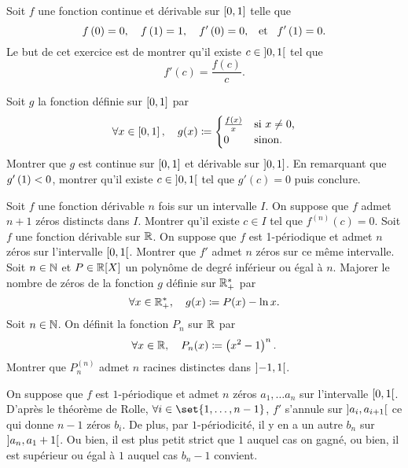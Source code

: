 \documentclass{magnolia}
\begin{document}
Soit $f$ une fonction continue et dérivable sur $\left[0,1\right]$ telle que
\[f\left(0\right)=0, \quad f\left(1\right)=1, \quad f'\left(0\right)=0, \quad\!\text{et}\quad\! f'\left(1\right)=0.\]
Le but de cet exercice est de montrer qu'il existe $c\in\left]0,1\right[$ tel
que
\[f'(c)=\frac{f(c)}{c}.\]
\begin{questions}
\question Soit $g$ la fonction définie sur $\left[0,1\right]$ par
  \[\forall x\in\left[0,1\right] ,\quad g(x)\coloneqq
    \begin{cases}
    \frac{f(x)}{x} & \text{si $x\neq 0$,}\\
    0 & \text{sinon.}
    \end{cases}\]
  Montrer que $g$ est continue sur $\left[0,1\right]$ et dérivable sur
  $\left]0,1\right]$.
\question En remarquant que $g'\left(1\right)<0$, montrer qu'il existe
  $c\in\left]0,1\right[$ tel que $g'(c)=0$ puis conclure.
\end{questions}



\begin{questions}
\question Soit $f$ une fonction dérivable $n$ fois sur un intervalle $I$. On
  suppose que $f$ admet $n+1$ zéros distincts dans $I$. Montrer qu'il existe
  $c\in I$ tel que $f^{(n)}(c)=0$.
\question Soit $f$ une fonction dérivable sur $\mathbb{R}$. On suppose que $f$ est
  1-périodique et admet $n$ zéros sur l'intervalle $\left[0,1\right[$. Montrer
  que $f'$ admet $n$ zéros sur ce même intervalle.
\question Soit $n\in\mathbb{N}$ et $P\in\polyR$ un polynôme de degré inférieur ou égal à $n$. Majorer le nombre de zéros de la
  fonction $g$ définie sur $\mathbb{R}_+^*$ par
  \[\forall x\in\mathbb{R}_+^* ,\quad g(x)\coloneqq P(x)-\ln x.\]
  \question Soit $n\in\mathbb{N}$. On définit la fonction $P_n$ sur $\mathbb{R}$ par
  \[\forall x\in\mathbb{R} ,\quad P_n(x)\coloneqq\left(x^2-1\right)^n.\]
  Montrer que $P_n^{(n)}$ admet $n$ racines distinctes dans $\left]-1,1\right[$.
\end{questions}

\begin{sol}
\begin{questions}
\question On suppose que $f$ est $1$-périodique et admet $n$ zéros $a_1,\ldots a_n$ sur l'intervalle $\left[0,1\right[$. D'après le théorème de Rolle, $\forall i \in \set{1,\ldots,n-1}$, $f'$ s'annule sur $\left]a_i,a_{i+1}\right[$ ce qui donne $n-1$ zéros $b_i$. De plus, par $1$-périodicité, il y en a un autre $b_n$ sur $\left]a_n,a_1+1\right[$. Ou bien, il est plus petit strict que $1$ auquel cas on gagné, ou bien, il est supérieur ou égal à $1$ auquel cas $b_n-1$ convient. 
\question 
\end{questions}

\end{sol}
\end{document}
